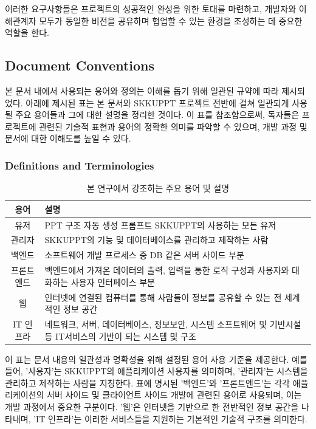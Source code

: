 \documentclass[a4paper, 12pt]{article}
\begin{document}
이러한 요구사항들은 프로젝트의 성공적인 완성을 위한 토대를 마련하고, 개발자와 이해관계자 모두가 동일한 비전을 공유하며 협업할 수 있는 환경을 조성하는 데 중요한 역할을 한다.



\subsection{Document Conventions}
본 문서 내에서 사용되는 용어와 정의는 이해를 돕기 위해 일관된 규약에 따라 제시되었다. 아래에 제시된 표는 본 문서와 SKKUPPT 프로젝트 전반에 걸쳐 일관되게 사용될 주요 용어들과 그에 대한 설명을 정리한 것이다. 이 표를 참조함으로써, 독자들은 프로젝트에 관련된 기술적 표현과 용어의 정확한 의미를 파악할 수 있으며, 개발 과정 및 문서에 대한 이해도를 높일 수 있다.

\subsubsection{Definitions and Terminologies}
\begin{table}[H]
\centering
\begin{tabularx}{\textwidth}{|c|X|}
\hline
\textbf{용어} & \textbf{설명} \\
\hline
유저 & PPT 구조 자동 생성 프롬프트 SKKUPPT의 사용하는 모든 유저 \\
\hline
관리자 & SKKUPPT의 기능 및 데이터베이스를 관리하고 제작하는 사람 \\
\hline
백엔드 & 소프트웨어 개발 프로세스 중 DB 같은 서버 사이드 부분 \\
\hline
프론트엔드 & 백엔드에서 가져온 데이터의 출력, 입력을 통한 로직 구성과 사용자와 대화하는 사용자 인터페이스 부분 \\
\hline
웹 & 인터넷에 연결된 컴퓨터를 통해 사람들이 정보를 공유할 수 있는 전 세계적인 정보 공간 \\
\hline
IT 인프라 & 네트워크, 서버, 데이터베이스, 정보보안, 시스템 소프트웨어 및 기반시설 등 IT서비스의 기반이 되는 시스템 및 구조 \\
\hline
\end{tabularx}
\caption{본 연구에서 강조하는 주요 용어 및 설명}
\label{table:definition}
\end{table}

이 표는 문서 내용의 일관성과 명확성을 위해 설정된 용어 사용 기준을 제공한다. 예를 들어, '사용자'는 SKKUPPT의 애플리케이션 사용자를 의미하며, '관리자'는 시스템을 관리하고 제작하는 사람을 지칭한다. 표에 명시된 '백엔드'와 '프론트엔드'는 각각 애플리케이션의 서버 사이드 및 클라이언트 사이드 개발에 관련된 용어로 사용되며, 이는 개발 과정에서 중요한 구분이다. '웹'은 인터넷을 기반으로 한 전반적인 정보 공간을 나타내며, 'IT 인프라'는 이러한 서비스들을 지원하는 기본적인 기술적 구조를 의미한다.
\end{document}
